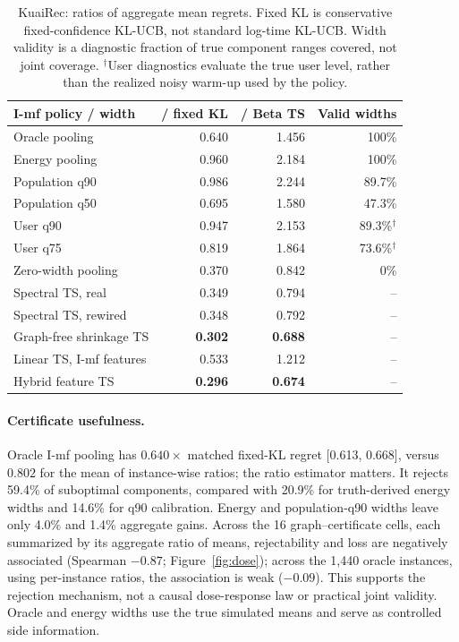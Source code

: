 \documentclass[sigconf,review,anonymous]{acmart}
\begin{document}
\begin{table}[t]\centering\small
\setlength{\tabcolsep}{3pt}
\begin{tabular}{lrrr}
\toprule
I-mf policy / width & / fixed KL & / Beta TS & Valid widths \\
\midrule
Oracle pooling & 0.640 & 1.456 & 100\% \\
Energy pooling & 0.960 & 2.184 & 100\% \\
Population q90 & 0.986 & 2.244 & 89.7\% \\
Population q50 & 0.695 & 1.580 & 47.3\% \\
User q90 & 0.947 & 2.153 & 89.3\%$^\dagger$ \\
User q75 & 0.819 & 1.864 & 73.6\%$^\dagger$ \\
Zero-width pooling & 0.370 & 0.842 & 0\% \\
Spectral TS, real & 0.349 & 0.794 & -- \\
Spectral TS, rewired & 0.348 & 0.792 & -- \\
Graph-free shrinkage TS & \textbf{0.302} & \textbf{0.688} & -- \\
Linear TS, I-mf features & 0.533 & 1.212 & -- \\
Hybrid feature TS & \textbf{0.296} & \textbf{0.674} & -- \\
\bottomrule
\end{tabular}
\caption{KuaiRec: ratios of aggregate mean regrets. Fixed KL is conservative fixed-confidence KL-UCB, not standard log-time KL-UCB. Width validity is a diagnostic fraction of true component ranges covered, not joint coverage. $^\dagger$User diagnostics evaluate the true user level, rather than the realized noisy warm-up used by the policy.}\label{tab:certgap}
\end{table}

\paragraph{Certificate usefulness.} Oracle I-mf pooling has $0.640\times$ matched fixed-KL regret [0.613, 0.668], versus $0.802$ for the mean of instance-wise ratios; the ratio estimator matters. It rejects 59.4\% of suboptimal components, compared with 20.9\% for truth-derived energy widths and 14.6\% for q90 calibration. Energy and population-q90 widths leave only 4.0\% and 1.4\% aggregate gains. Across the 16 graph--certificate cells, each summarized by its aggregate ratio of means, rejectability and loss are negatively associated (Spearman $-0.87$; Figure~\ref{fig:dose}); across the 1,440 oracle instances, using per-instance ratios, the association is weak ($-0.09$). This supports the rejection mechanism, not a causal dose-response law or practical joint validity. Oracle and energy widths use the true simulated means and serve as controlled side information.
\end{document}
